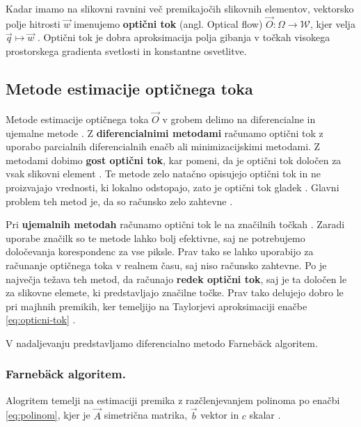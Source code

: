 Kadar imamo na slikovni ravnini več premikajočih slikovnih elementov, vektorsko polje hitrosti $\vec{w}$ imenujemo \textbf{optični tok} (angl. Optical flow) $\vec{O}: \mathit{\Omega} \to \mathcal{W}$, kjer velja $ \vec{q} \mapsto \vec{w}$ \cite{trucco1998introductory}. Optični tok je dobra aproksimacija polja gibanja v točkah visokega prostorskega gradienta svetlosti in konstantne osvetlitve.



\subsection{Metode estimacije optičnega toka}\label{sec:metode-of}

Metode estimacije optičnega toka $\vec{O}$ v grobem delimo na diferencialne in {ujemalne} metode \cite{trucco1998introductory}. Z \textbf{diferencialnimi metodami} računamo optični tok z uporabo parcialnih diferencialnih enačb ali minimizacijskimi metodami. Z metodami dobimo \textbf{gost optični tok}, kar pomeni, da je optični tok določen za vsak slikovni element \cite{trucco1998introductory}. Te metode zelo natačno opisujejo optični tok in ne proizvajajo vrednosti, ki lokalno odstopajo, zato je optični tok gladek \cite{brox2011large}.  Glavni problem teh metod je, da so računsko zelo zahtevne \cite{trucco1998introductory}.

Pri \textbf{ujemalnih metodah} računamo optični tok le na značilnih točkah \cite{trucco1998introductory}. Zaradi uporabe značilk so te metode lahko bolj efektivne, saj ne potrebujemo določevanja korespondenc za vse piksle. Prav tako se lahko uporabijo za računanje optičnega toka v realnem času, saj niso računsko zahtevne. Po \cite{trucco1998introductory} je največja težava teh metod, da računajo \textbf{redek optični tok}, saj je ta določen le za slikovne elemete, ki predstavljajo značilne točke. Prav tako delujejo dobro le pri majhnih premikih, ker temeljijo na Taylorjevi aproksimaciji enačbe \eqref{eq:opticni-tok} \cite{wedel2011stereo}. 

V nadaljevanju predstavljamo diferencialno metodo Farneb{\"a}ck algoritem.

\subsubsection{Farneb{\"a}ck algoritem.}
Alogritem temelji na estimaciji premika z razčlenjevanjem polinoma  po enačbi \eqref{eq:polinom}, kjer je $\vec{A}$ simetrična matrika, $\vec{b}$ vektor in $c$ skalar \cite{farneback2003two}.

